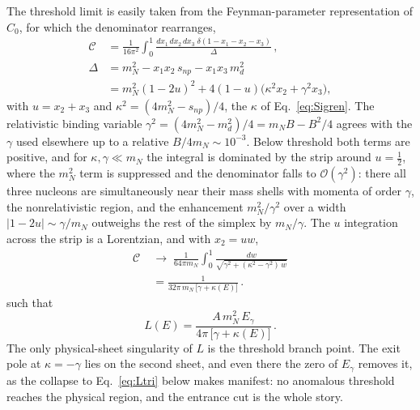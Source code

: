 \documentclass[
  aps,prd,twocolumn,nofootinbib,superscriptaddress,
  longbibliography,floatfix,preprintnumbers
]{revtex4-2}
\newcommand{\Egam}{E_{\gamma}}
\begin{document}
The threshold limit is easily taken from the Feynman-parameter representation of $C_0$, for which the denominator rearranges,
\begin{equation}
\begin{split}
  \mathcal{C} &= \frac{1}{16\pi^{2}}\!\int_{0}^{1}\!
  \frac{dx_{1}\,dx_{2}\,dx_{3}\;\delta(1-x_{1}-x_{2}-x_{3})}{\Delta}\,,\\
  \Delta &= m_{N}^{2}-x_{1}x_{2}\,s_{np}-x_{1}x_{3}\,m_{d}^{2}\\
         &= m_{N}^{2}(1-2u)^{2}
           + 4(1-u)\big(\kappa^{2}x_{2}+\gamma^{2}x_{3}\big),
\end{split}
  \label{eq:Cparam}
\end{equation}
with $u=x_{2}+x_{3}$ and $\kappa^{2}=(4m_{N}^{2}-s_{np})/4$, the $\kappa$ of
Eq.~\eqref{eq:Sigren}. The relativistic binding variable
$\gamma^{2}=(4m_{N}^{2}-m_{d}^{2})/4=m_{N}B-B^{2}/4$ agrees with the $\gamma$
used elsewhere up to a relative $B/4m_{N}\sim10^{-3}$. Below threshold both terms are positive, and for
$\kappa,\gamma\ll m_{N}$ the integral is dominated by the strip around
$u=\tfrac12$, where the $m_{N}^{2}$ term is suppressed and the
denominator falls to $\mathcal{O}(\gamma^{2})$: there all three nucleons
are simultaneously near their mass shells with momenta of order
$\gamma$, the nonrelativistic region, and the enhancement
$m_{N}^{2}/\gamma^{2}$ over a width $|1-2u|\sim\gamma/m_{N}$ outweighs
the rest of the simplex by $m_{N}/\gamma$. The $u$ integration across
the strip is a Lorentzian, and with $x_{2}=uw$,
\begin{equation}
\begin{split}
  \mathcal{C} \;&\longrightarrow\;
  \frac{1}{64\pi m_{N}}\!\int_{0}^{1}\!
  \frac{dw}{\sqrt{\gamma^{2}+(\kappa^{2}-\gamma^{2})\,w}}\\
  &= \frac{1}{32\pi\,m_{N}\,\big[\gamma+\kappa(E)\big]}\,.
\end{split}
  \label{eq:Cnr}
\end{equation}
such that
\begin{equation}
  L(E) = \frac{A\,m_{N}^{2}\,\Egam}{4\pi\,\big[\gamma+\kappa(E)\big]}\,.
  \label{eq:Ldisp}
\end{equation}
The only physical-sheet singularity of $L$ is the threshold branch
point. The exit pole at $\kappa=-\gamma$ lies on the second sheet, and
even there the zero of $\Egam$ removes it, as the collapse to
Eq.~\eqref{eq:Ltri} below makes manifest: no anomalous threshold reaches
the physical region, and the entrance cut is the whole story.
\end{document}
